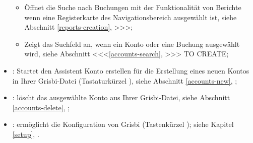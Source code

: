 \begin{itemize}
\begin{itemize}
		\item Öffnet die Suche nach Buchungen mit der Funktionalität von Berichte wenn eine Registerkarte des Navigationsbereich ausgewählt ist, siehe Abschnitt \vref{reports-creation}, >>>;%
		\item Zeigt das Suchfeld an, wenn ein Konto oder eine Buchung ausgewählt wird, siehe Abschnitt <<<\vref{accounts-search}, >>> TO CREATE; %
	\end{itemize}
	\item {}: Startet den Assistent Konto erstellen für die Erstellung eines neuen Kontos in Ihrer Grisbi-Datei (Tastaturkürzel ), siehe Abschnitt \vref{accounts-new}, ;%
	\item {}: löscht das ausgewählte Konto aus Ihrer Grisbi-Datei, siehe Abschnitt \vref{accounts-delete}, ;%
	\item {}: ermöglicht die Konfiguration von Grisbi (Tastenkürzel ); siehe Kapitel \vref{setup}, .%
\end{itemize}


